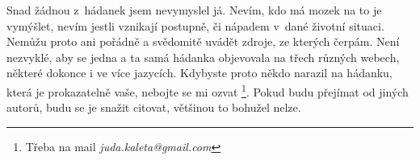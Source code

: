 \documentclass[czech]{book}
\begin{document}
Snad žádnou z~hádanek jsem nevymyslel já. Nevím, kdo má mozek na to
je vymýšlet, nevím jestli vznikají postupně, či nápadem v~dané životní
situaci. Nemůžu proto ani pořádně a svědomitě uvádět zdroje, ze kterých čerpám.
Není nezvyklé, aby se jedna a ta samá hádanka objevovala na třech různých webech,
některé dokonce i ve více jazycích. Kdybyste proto někdo narazil na
hádanku, která je prokazatelně vaše, nebojte se mi ozvat
\footnote{Třeba na mail \emph{juda.kaleta@gmail.com}}. Pokud budu přejímat od
jiných autorů, budu se je snažit citovat, většinou to bohužel nelze.


\end{document}
